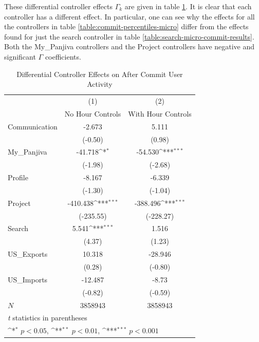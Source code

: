 \documentclass[12pt]{article}
\begin{document}
These differential controller effects $\Gamma_k$ are given in table \ref{table:gamma-effects}. It is clear that each controller has a different effect. In particular, one can see why the effects for all the controllers in table \ref{table:commit-percentiles-micro} differ from the effects found for just the search controller in table \ref{table:search-micro-commit-results}. Both the My\_Panjiva controllers and the Project controllers have negative and significant $\Gamma$ coefficients. 

\begin{table}[h!]
\centering
\caption{Differential Controller Effects on After Commit User Activity}
{
    \def\sym#1{\ifmmode^{#1}\else\(^{#1}\)\fi}
    \begin{tabular}{l*{2}{c}}
    \hline\hline
        &\multicolumn{1}{c}{(1)}&\multicolumn{1}{c}{(2)}\\
        &\multicolumn{1}{c}{No Hour Controls}&\multicolumn{1}{c}{With Hour Controls}\\
        \hline
        Communication & -2.673 & 5.111 \\
        & (-0.50) & (0.98) \\
        [1em]
        My\_Panjiva & -41.718\sym{*} & -54.530\sym{***} \\
        & (-1.98) & (-2.68) \\
        [1em]
        Profile & -8.167 & -6.339 \\
        & (-1.30) & (-1.04) \\
        [1em]
        Project & -410.438\sym{***} & -388.496\sym{***} \\
        & (-235.55) & (-228.27) \\
        [1em]
        Search & 5.541\sym{***} & 1.516 \\
        & (4.37) & (1.23) \\
        [1em]
        US\_Exports & 10.318 & -28.946 \\
        & (0.28) & (-0.80) \\
        [1em]
        US\_Imports & -12.487 & -8.73 \\
        & (-0.82) & (-0.59)\\
        \hline
        \(N\)       & 3858943  & 3858943   \\
        \hline \hline
        \multicolumn{3}{l}{\footnotesize \textit{t} statistics in parentheses}\\
        \multicolumn{3}{l}{\footnotesize \sym{*} \(p<0.05\), \sym{**} \(p<0.01\), \sym{***} \(p<0.001\)}\\
    \end{tabular}
}
\label{table:gamma-effects}
\end{table}
\end{document}
